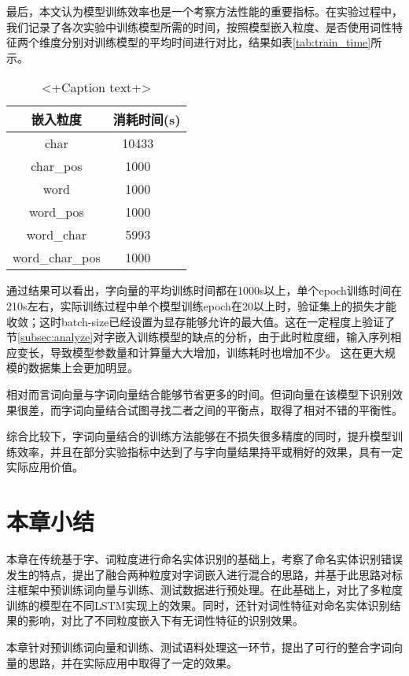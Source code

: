 最后，本文认为模型训练效率也是一个考察方法性能的重要指标。在实验过程中，我们记录了各次实验中训练模型所需的时间，按照模型嵌入粒度、是否使用词性特征两个维度分别对训练模型的平均时间进行对比，结果如表\ref{tab:train_time}所示。

\begin{table}
    \centering
    \begin{tabular}{ccc}
        嵌入粒度 & \multicolumn{2}{c}{消耗时间(s)}\\
        \midrule
        char  & 10433\\
        char\_pos & 1000\\
        word  & 1000\\
        word\_pos  & 1000\\
        word\_char  & 5993\\
        word\_char\_pos  & 1000\\
    \end{tabular}
    \caption{<+Caption text+>}
    \label{tab:<+label+>}
\end{table}

通过结果可以看出，字向量的平均训练时间都在1000s以上，单个epoch训练时间在210s左右，实际训练过程中单个模型训练epoch在20以上时，验证集上的损失才能收敛；这时batch-size已经设置为显存能够允许的最大值。这在一定程度上验证了节\ref{subsec:analyze}对字嵌入训练模型的缺点的分析，由于此时粒度细，输入序列相应变长，导致模型参数量和计算量大大增加，训练耗时也增加不少。
这在更大规模的数据集上会更加明显。

相对而言词向量与字词向量结合能够节省更多的时间。但词向量在该模型下识别效果很差，而字词向量结合试图寻找二者之间的平衡点，取得了相对不错的平衡性。

综合比较下，字词向量结合的训练方法能够在不损失很多精度的同时，提升模型训练效率，并且在部分实验指标中达到了与字向量结果持平或稍好的效果，具有一定实际应用价值。

\section{本章小结}
本章在传统基于字、词粒度进行命名实体识别的基础上，考察了命名实体识别错误发生的特点，提出了融合两种粒度对字词嵌入进行混合的思路，并基于此思路对标注框架中预训练词向量与训练、测试数据进行预处理。在此基础上，对比了多粒度训练的模型在不同LSTM实现上的效果。同时，还针对词性特征对命名实体识别结果的影响，对比了不同粒度嵌入下有无词性特征的识别效果。

本章针对预训练词向量和训练、测试语料处理这一环节，提出了可行的整合字词向量的思路，并在实际应用中取得了一定的效果。
